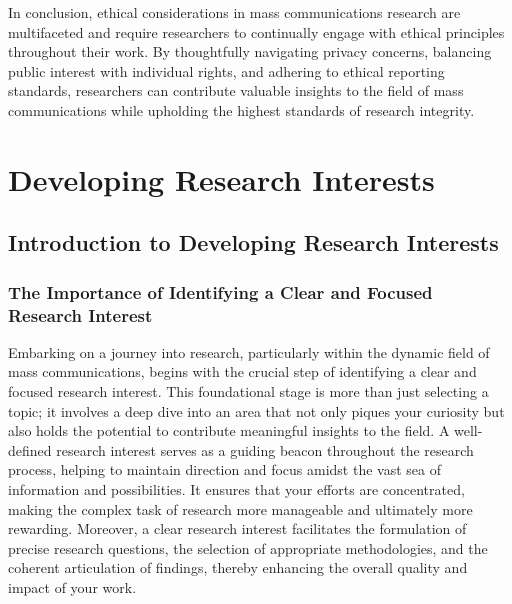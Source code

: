 \documentclass[
]{book}
\begin{document}
In conclusion, ethical considerations in mass communications research are multifaceted and require researchers to continually engage with ethical principles throughout their work. By thoughtfully navigating privacy concerns, balancing public interest with individual rights, and adhering to ethical reporting standards, researchers can contribute valuable insights to the field of mass communications while upholding the highest standards of research integrity.

\hypertarget{developing-research-interests}{%
\chapter{Developing Research Interests}\label{developing-research-interests}}

\hypertarget{introduction-to-developing-research-interests}{%
\section{Introduction to Developing Research Interests}\label{introduction-to-developing-research-interests}}

\hypertarget{the-importance-of-identifying-a-clear-and-focused-research-interest}{%
\subsection*{The Importance of Identifying a Clear and Focused Research Interest}\label{the-importance-of-identifying-a-clear-and-focused-research-interest}}

Embarking on a journey into research, particularly within the dynamic field of mass communications, begins with the crucial step of identifying a clear and focused research interest. This foundational stage is more than just selecting a topic; it involves a deep dive into an area that not only piques your curiosity but also holds the potential to contribute meaningful insights to the field. A well-defined research interest serves as a guiding beacon throughout the research process, helping to maintain direction and focus amidst the vast sea of information and possibilities. It ensures that your efforts are concentrated, making the complex task of research more manageable and ultimately more rewarding. Moreover, a clear research interest facilitates the formulation of precise research questions, the selection of appropriate methodologies, and the coherent articulation of findings, thereby enhancing the overall quality and impact of your work.
\end{document}
